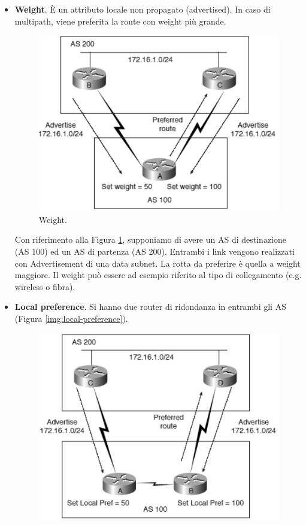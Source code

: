 \begin{itemize}
	\item \textbf{Weight}. È un attributo locale non propagato (advertised). In caso di multipath, viene preferita la route con weight più grande.
		\begin{figure}[htbp]
			\centering
			\includegraphics[scale = 0.4]{images/weight}
			\caption{Weight.}
			\label{img:weight}
		\end{figure}
	Con riferimento alla Figura \ref{img:weight}, supponiamo di avere un AS di destinazione (AS 100) ed un AS di partenza (AS 200). Entrambi i link vengono realizzati con Advertisement di una data subnet. La rotta da preferire è quella a weight maggiore. Il weight può essere ad esempio riferito al tipo di collegamento (e.g. wireless o fibra).
	\item \textbf{Local preference}. Si hanno due router di ridondanza in entrambi gli AS (Figura \ref{img:local-preference}).
		\begin{figure}[htbp]
			\centering
			\includegraphics[scale = 0.4]{images/local-preference}

\end{figure}
\end{itemize}
